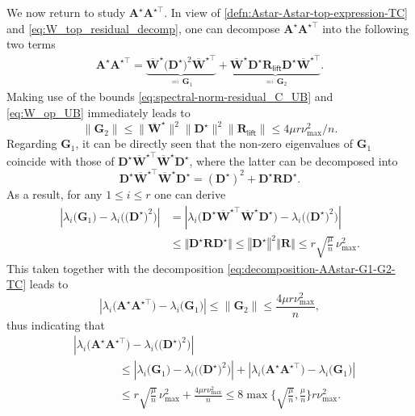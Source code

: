 We now return to study $\bm{A}^{\star}\bm{A}^{\star\top}$. In view of \eqref{defn:Astar-Astar-top-expression-TC} and \eqref{eq:W_top_residual_decomp}, one can decompose $\bm{A}^{\star}\bm{A}^{\star\top}$ into the following two terms
%
\begin{align}
	\bm{A}^{\star}\bm{A}^{\star\top}
	=  \underset{\eqqcolon\, \bm{G}_1 }{\underbrace{  \overline{\bm{W}}^{\star} \big( \bm{D}^{\star} \big)^2 \overline{\bm{W}}^{\star\top} }}
	+  \underset{\eqqcolon\, \bm{G}_2 }{\underbrace{ \overline{\bm{W}}^{\star}  \bm{D}^{\star}  {\bm{R}_{\mathsf{lift}}}  \bm{D}^{\star}   \overline{\bm{W}}^{\star\top} }}.
	\label{eq:decomposition-AAstar-G1-G2-TC}
\end{align}
%
Making use of the bounds \eqref{eq:spectral-norm-residual_C_UB} and \eqref{eq:W_op_UB} immediately leads to
%
\[
	\big\|\bm{G}_{2}\big\| \leq  \big\|\overline{\bm{W}}^{\star}\big\|^{2}\big\|\bm{D}^{\star}\big\|^{2}\big\|\bm{R}_{\mathsf{lift}}\big\|\leq 4\mu r \nu_{\max}^2 / n.
\]
%
Regarding $\bm{G}_1$, it can be directly seen that  the  non-zero eigenvalues of $\bm{G}_1$ coincide with those of $ \bm{D}^{\star}  \overline{\bm{W}}^{\star\top}\overline{\bm{W}}^{\star}  \bm{D}^{\star} $, where the latter can be decomposed into
%
\[
	 \bm{D}^{\star}  \overline{\bm{W}}^{\star\top}\overline{\bm{W}}^{\star}  \bm{D}^{\star}
	= (\bm{D}^{\star})^2 +  \bm{D}^{\star}  \bm{R}  \bm{D}^{\star} .
\]
%
As a result, for any $1\leq i\leq r$ one can derive
%
\begin{align*}
	\left|\lambda_{i}\big(\bm{G}_{1}\big)-\lambda_{i}\big( \big(\bm{D}^{\star}\big)^2 \big)\right| & =\left|\lambda_{i}\big(\bm{D}^{\star} \overline{\bm{W}}^{\star\top}\overline{\bm{W}}^{\star} \bm{D}^{\star} \Big)-\lambda_{i}\big(\big(\bm{D}^{\star}\big)^{2}\big)\right|\\
 & \leq \big\Vert  \bm{D}^{\star} \bm{R} \bm{D}^{\star} \big\Vert
   \leq \left\Vert \bm{D}^{\star}\right\Vert ^{2}\left\Vert \bm{R}\right\Vert \leq r\sqrt{\frac{\mu}{n}}\,\nu_{\max}^{2}.
\end{align*}
%
This taken together with the decomposition \eqref{eq:decomposition-AAstar-G1-G2-TC} leads to
%
\[
	\left|\lambda_{i}\big(\bm{A}^{\star}\bm{A}^{\star\top}\big)-\lambda_{i}\big(\bm{G}_{1}\big)\right|\leq\big\|\bm{G}_{2}\big\|\leq\frac{4\mu r\nu_{\max}^{2}}{n},
\]
%
thus indicating that
%
\begin{align*}
	& \left|\lambda_{i}\big(\bm{A}^{\star}\bm{A}^{\star\top}\big)-\lambda_{i}\big(\big(\bm{D}^{\star}\big)^{2}\big)\right| \\
	&\qquad\qquad \leq\left|\lambda_{i}\big(\bm{G}_{1}\big)-\lambda_{i}\big(\big(\bm{D}^{\star}\big)^{2}\big)\right|+\left|\lambda_{i}\big(\bm{A}^{\star}\bm{A}^{\star\top}\big)-\lambda_{i}\big(\bm{G}_{1}\big)\right|\\
 	& \qquad\qquad \leq r\sqrt{\frac{\mu}{n}}\,\nu_{\max}^{2}+\frac{4\mu r \nu_{\max}^{2}}{n}
	\leq  8 \max\Big\{ \sqrt{\frac{\mu}{n}}, \frac{\mu }{n} \Big\} r\nu_{\max}^{2}.
\end{align*}

